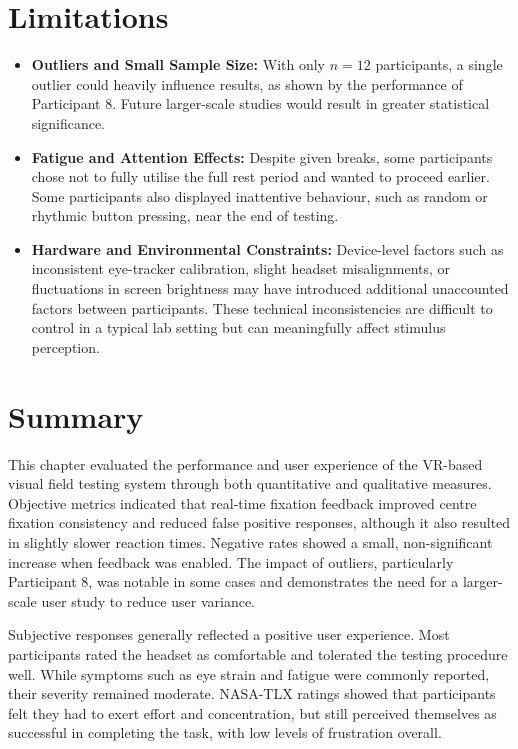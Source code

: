 \documentclass{l4proj}
\begin{document}
\section{Limitations}
\begin{itemize}
    \item \textbf{Outliers and Small Sample Size:} With only $n=12$ participants, a single outlier could heavily influence results, as shown by the performance of Participant 8. Future larger-scale studies would result in greater statistical significance.
    \item \textbf{Fatigue and Attention Effects:} Despite given breaks, some participants chose not to fully utilise the full rest period and wanted to proceed earlier. Some participants also displayed inattentive behaviour, such as random or rhythmic button pressing, near the end of testing.
    \item \textbf{Hardware and Environmental Constraints:} Device-level factors such as inconsistent eye-tracker calibration, slight headset misalignments, or fluctuations in screen brightness may have introduced additional unaccounted factors between participants. These technical inconsistencies are difficult to control in a typical lab setting but can meaningfully affect stimulus perception.
\end{itemize}

\section{Summary}

This chapter evaluated the performance and user experience of the VR-based visual field testing system through both quantitative and qualitative measures. Objective metrics indicated that real-time fixation feedback improved centre fixation consistency and reduced false positive responses, although it also resulted in slightly slower reaction times. Negative rates showed a small, non-significant increase when feedback was enabled. The impact of outliers, particularly Participant 8, was notable in some cases and demonstrates the need for a larger-scale user study to reduce user variance. 

Subjective responses generally reflected a positive user experience. Most participants rated the headset as comfortable and tolerated the testing procedure well. While symptoms such as eye strain and fatigue were commonly reported, their severity remained moderate. NASA-TLX ratings showed that participants felt they had to exert effort and concentration, but still perceived themselves as successful in completing the task, with low levels of frustration overall.
\end{document}
